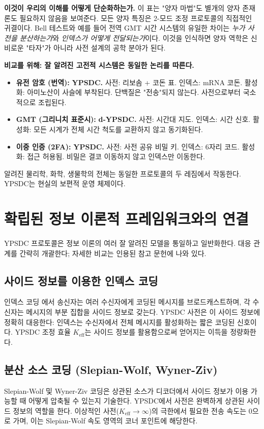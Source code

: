 \documentclass[12pt,a4paper]{article}
\begin{document}
	\noindent
	\textbf{이것이 우리의 이해를 어떻게 단순화하는가.}
	이 표는 "양자 마법"도 별개의 양자 존재론도 필요하지 않음을 보여준다. 모든 양자 특징은 2-모드 조정 프로토콜의 직접적인 귀결이다. Bell 테스트와 예를 들어 전역 GMT 시간 시스템의 유일한 차이는 \emph{누가 사전을 분산하는가}와 \emph{인덱스가 어떻게 전달되는가}이다. 이것을 인식하면 양자 역학은 신비로운 "타자"가 아니라 사전 설계의 공학 분야가 된다.
	
	\textbf{비교를 위해: 잘 알려진 고전적 시스템은 동일한 논리를 따른다.}
	\begin{itemize}
		\item \textbf{유전 암호 (번역):} \textbf{YPSDC.} 사전: 리보솜 + 코돈 표. 인덱스: mRNA 코돈. 활성화: 아미노산이 사슬에 부착된다. 단백질은 "전송"되지 않는다. 사전으로부터 국소적으로 조립된다.
		\item \textbf{GMT (그리니치 표준시):} \textbf{d-YPSDC.} 사전: 시간대 지도. 인덱스: 시간 신호. 활성화: 모든 시계가 전체 시간 척도를 교환하지 않고 동기화된다.
		\item \textbf{이중 인증 (2FA):} \textbf{YPSDC.} 사전: 사전 공유 비밀 키. 인덱스: 6자리 코드. 활성화: 접근 허용됨. 비밀은 결코 이동하지 않고 인덱스만 이동한다.
	\end{itemize}
	
	알려진 물리학, 화학, 생물학의 전체는 동일한 프로토콜의 두 레짐에서 작동한다. YPSDC는 현실의 보편적 운영 체제이다.
	
	\section{확립된 정보 이론적 프레임워크와의 연결}
	\label{sec:classical-connections}
	
	YPSDC 프로토콜은 정보 이론의 여러 잘 알려진 모델을 통일하고 일반화한다. 대응 관계를 간략히 개괄한다; 자세한 비교는 인용된 참고 문헌에 나와 있다.
	
	\subsection*{사이드 정보를 이용한 인덱스 코딩}
	인덱스 코딩 \cite{Birk1998,BarYossef2011}에서 송신자는 여러 수신자에게 코딩된 메시지를 브로드캐스트하며, 각 수신자는 메시지의 부분 집합을 사이드 정보로 갖는다. YPSDC 사전은 이 사이드 정보에 정확히 대응한다: 인덱스는 수신자에서 전체 메시지를 활성화하는 짧은 코딩된 신호이다. YPSDC 조정 효율 $K_{\mathrm{eff}}$는 사이드 정보를 활용함으로써 얻어지는 이득을 정량화한다.
	
	\subsection*{분산 소스 코딩 (Slepian-Wolf, Wyner-Ziv)}
	Slepian-Wolf \cite{SlepianWolf1973} 및 Wyner-Ziv \cite{WynerZiv1976} 코딩은 상관된 소스가 디코더에서 사이드 정보가 이용 가능할 때 어떻게 압축될 수 있는지 기술한다. YPSDC에서 사전은 완벽하게 상관된 사이드 정보의 역할을 한다. 이상적인 사전($K_{\mathrm{eff}} \to \infty$)의 극한에서 필요한 전송 속도는 0으로 가며, 이는 Slepian-Wolf 속도 영역의 코너 포인트에 해당한다.
	
\end{document}
